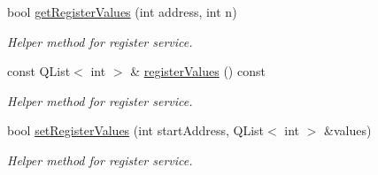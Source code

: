 \begin{DoxyCompactItemize}
bool \hyperlink{classmdt_device_modbus_a89d41c6b33a3dd2a92a0956d8e6b3b14}{get\-Register\-Values} (int address, int n)
\begin{DoxyCompactList}\small\item\em Helper method for register service. \end{DoxyCompactList}\item 
const Q\-List$<$ int $>$ \& \hyperlink{classmdt_device_modbus_a83cb2a28111653fbcbbe748f7a1a2e3d}{register\-Values} () const 
\begin{DoxyCompactList}\small\item\em Helper method for register service. \end{DoxyCompactList}\item 
bool \hyperlink{classmdt_device_modbus_a4128420bde679c3666bdf8954a221a53}{set\-Register\-Values} (int start\-Address, Q\-List$<$ int $>$ \&values)
\begin{DoxyCompactList}\small\item\em Helper method for register service. \end{DoxyCompactList}\end{DoxyCompactItemize}
